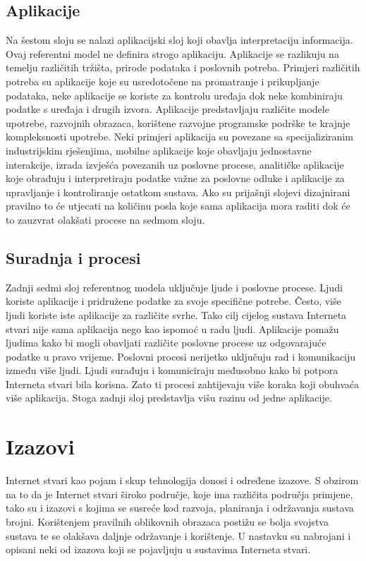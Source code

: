 \documentclass[times, utf8, diplomski]{fer}
\begin{document}
\subsection{Aplikacije}
Na šestom sloju se nalazi aplikacijski sloj koji obavlja interpretaciju informacija. Ovaj referentni model ne definira strogo aplikaciju. Aplikacije se razlikuju na temelju različitih tržišta, prirode podataka i poslovnih potreba. Primjeri različitih potreba su aplikacije koje su usredotočene na promatranje i prikupljanje podataka, neke aplikacije se koriste za kontrolu uređaja dok neke kombiniraju podatke s uređaja i drugih izvora. Aplikacije predstavljaju različite modele upotrebe, razvojnih obrazaca, korištene razvojne programske podrške te krajnje kompleksnosti upotrebe. Neki primjeri aplikacija su povezane sa specijaliziranim industrijskim rješenjima, mobilne aplikacije koje obavljaju jednostavne interakcije, izrada izvješća povezanih uz poslovne procese, analitičke aplikacije koje obrađuju i interpretiraju podatke važne za poslovne odluke i aplikacije za upravljanje i kontroliranje ostatkom sustava. Ako su prijašnji slojevi dizajnirani pravilno to će utjecati na količinu posla koje sama aplikacija mora raditi dok će to zauzvrat olakšati procese na sedmom sloju. 

\subsection{Suradnja i procesi}
Zadnji sedmi sloj referentnog modela uključuje ljude i poslovne procese. Ljudi koriste aplikacije i pridružene podatke za svoje specifične potrebe. Često, više ljudi koriste iste aplikacije za različite svrhe. Tako cilj cijelog sustava Interneta stvari nije sama aplikacija nego kao ispomoć u radu ljudi. Aplikacije pomažu ljudima kako bi mogli obavljati različite poslovne procese uz odgovarajuće podatke u pravo vrijeme. Poslovni procesi nerijetko uključuju rad i komunikaciju između više ljudi. Ljudi surađuju i komuniciraju međusobno kako bi potpora Interneta stvari bila korisna. Zato ti procesi zahtijevaju više koraka koji obuhvaća više aplikacija. Stoga zadnji sloj predstavlja višu razinu od jedne aplikacije.

\section{Izazovi}
Internet stvari kao pojam i skup tehnologija donosi i određene izazove. S obzirom na to da je Internet stvari široko područje, koje ima različita područja primjene, tako su i izazovi s kojima se susreće kod razvoja, planiranja i održavanja sustava brojni. Korištenjem pravilnih oblikovnih obrazaca postižu se bolja svojstva sustava te se olakšava daljnje održavanje i korištenje. U nastavku su nabrojani i opisani neki od izazova koji se pojavljuju u sustavima Interneta stvari.
\end{document}
